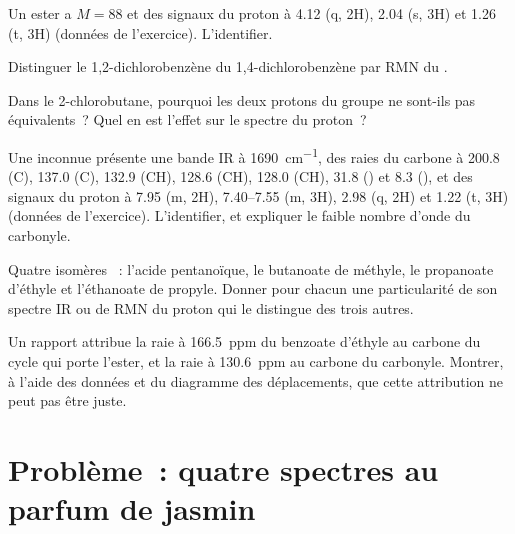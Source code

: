 \begin{exercise}[$\star\star$]\label{exo:b2:structure-determination:7}
Un ester a $M = 88$ et des signaux du proton à 4.12 (q, 2H), 2.04 (s, 3H) et 1.26 (t, 3H) (données de
l'exercice). L'identifier.
\end{exercise}

\begin{exercise}[$\star\star$]\label{exo:b2:structure-determination:8}
Distinguer le 1,2-dichlorobenzène du 1,4-dichlorobenzène par RMN du .
\end{exercise}

\begin{exercise}[$\star\star$]\label{exo:b2:structure-determination:9}
Dans le 2-chlorobutane, pourquoi les deux protons du groupe  ne sont-ils pas équivalents~? Quel
en est l'effet sur le spectre du proton~?
\end{exercise}

\begin{exercise}[$\star\star\star$]\label{exo:b2:structure-determination:10}
Une inconnue  présente une bande IR à \qty{1690}{cm^{-1}}, des raies du carbone à 200.8 (C),
137.0 (C), 132.9 (CH), 128.6 (CH), 128.0 (CH), 31.8 () et 8.3 (), et des signaux du
proton à 7.95 (m,
2H), 7.40--7.55 (m, 3H), 2.98 (q, 2H) et 1.22 (t, 3H) (données de l'exercice). L'identifier, et expliquer
le faible nombre d'onde du carbonyle.
\end{exercise}

\begin{exercise}[$\star\star\star$]\label{exo:b2:structure-determination:11}
Quatre isomères ~: l'acide pentanoïque, le butanoate de méthyle, le propanoate d'éthyle et
l'éthanoate de propyle. Donner pour chacun une particularité de son spectre IR ou de RMN du proton qui le
distingue des trois autres.
\end{exercise}

\begin{exercise}[$\star\star\star$]\label{exo:b2:structure-determination:12}
Un rapport attribue la raie à 166.5~ppm du benzoate d'éthyle au carbone du cycle qui porte l'ester, et
la raie à 130.6~ppm au carbone du carbonyle. Montrer, à l'aide des données  et du diagramme des
déplacements, que cette attribution ne peut pas être juste.
\end{exercise}

\section{Problème~: quatre spectres au parfum de jasmin}

